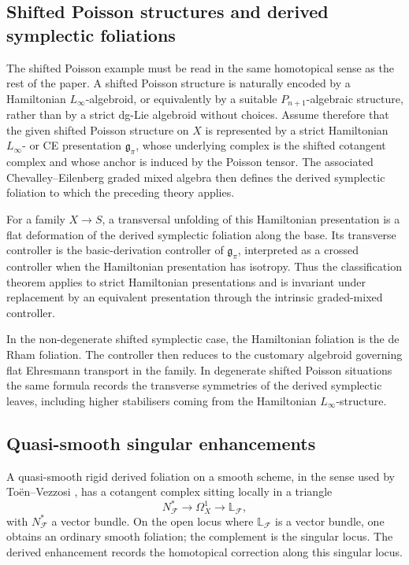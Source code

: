 \documentclass[11pt,reqno,a4paper,dvipsnames,x11names]{amsart}
\numberwithin{equation}{section}
\theoremstyle{plain}
\theoremstyle{definition}
\theoremstyle{remark}
\newcommand{\cF}{\mathcal F}
\newcommand{\g}{\mathfrak g}
\newcommand{\bbL}{\mathbb L}
\begin{document}
\subsection{Shifted Poisson structures and derived symplectic foliations}

The shifted Poisson example must be read in the same homotopical sense as the rest of the paper. A shifted Poisson structure is naturally encoded by a Hamiltonian \(L_\infty\)-algebroid, or equivalently by a suitable \(P_{n+1}\)-algebraic structure, rather than by a strict dg-Lie algebroid without choices. Assume therefore that the given shifted Poisson structure on \(X\) is represented by a strict Hamiltonian \(L_\infty\)- or CE presentation \(\g_\pi\), whose underlying complex is the shifted cotangent complex and whose anchor is induced by the Poisson tensor. The associated Chevalley--Eilenberg graded mixed algebra then defines the derived symplectic foliation to which the preceding theory applies.

For a family \(X\to S\), a transversal unfolding of this Hamiltonian presentation is a flat deformation of the derived symplectic foliation along the base. Its transverse controller is the basic-derivation controller of \(\g_\pi\), interpreted as a crossed controller when the Hamiltonian presentation has isotropy. Thus the classification theorem applies to strict Hamiltonian presentations and is invariant under replacement by an equivalent presentation through the intrinsic graded-mixed controller.

In the non-degenerate shifted symplectic case, the Hamiltonian foliation is the de Rham foliation. The controller then reduces to the customary algebroid governing flat Ehresmann transport in the family. In degenerate shifted Poisson situations the same formula records the transverse symmetries of the derived symplectic leaves, including higher stabilisers coming from the Hamiltonian \(L_\infty\)-structure.

\subsection{Quasi-smooth singular enhancements}

A quasi-smooth rigid derived foliation on a smooth scheme, in the sense used by To\"en--Vezzosi \cite{TVRH,TV}, has a cotangent complex sitting locally in a triangle
\[
 N^*_{\cF}\longrightarrow\Omega^1_X\longrightarrow\bbL_\cF,
\]
with \(N^*_{\cF}\) a vector bundle. On the open locus where \(\bbL_\cF\) is a vector bundle, one obtains an ordinary smooth foliation; the complement is the singular locus. The derived enhancement records the homotopical correction along this singular locus.
\end{document}
